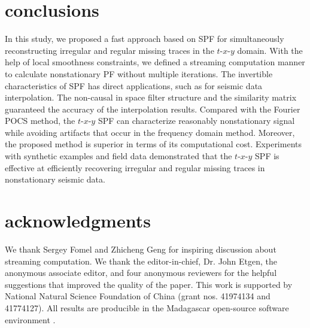 \section{conclusions}
In this study, we proposed a fast approach based on SPF for
simultaneously reconstructing irregular and regular missing traces in
the $t$-$x$-$y$ domain. With the help of local smoothness constraints,
we defined a streaming computation manner to calculate nonstationary
PF without multiple iterations. The invertible characteristics of SPF
has direct applications, such as for seismic data interpolation. The
non-causal in space filter structure and the similarity matrix
guaranteed the accuracy of the interpolation results.  Compared with
the Fourier POCS method, the $t$-$x$-$y$ SPF can characterize
reasonably nonstationary signal while avoiding artifacts that occur in
the frequency domain method. Moreover, the proposed method is superior
in terms of its computational cost. Experiments with synthetic
examples and field data demonstrated that the $t$-$x$-$y$ SPF is
effective at efficiently recovering irregular and regular missing
traces in nonstationary seismic data.

\section{acknowledgments}
We thank Sergey Fomel and Zhicheng Geng for inspiring discussion about
streaming computation. We thank the editor-in-chief, Dr. John Etgen,
the anonymous associate editor, and four anonymous reviewers for the
helpful suggestions that improved the quality of the paper. This work
is supported by National Natural Science Foundation of China (grant
nos. 41974134 and 41774127). All results are producible in the
Madagascar open-source software environment \cite[]{Fomel13}.



